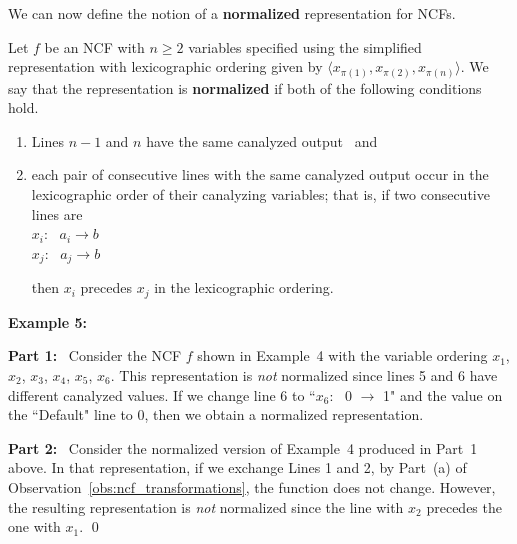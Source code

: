 
\medskip
We can now define the notion of a \textbf{normalized} 
representation for NCFs.

\begin{definition}
\label{def:normalized}
Let $f$ be an NCF with $n \geq 2$ variables specified using
the simplified representation with 
lexicographic ordering given by  
$\langle x_{\pi(1)}, x_{\pi(2)}, x_{\pi(n)}\rangle$.
We say that the representation is {\bf normalized} if
both of the following conditions hold.
\begin{enumerate}
  \item Lines $n-1$ and $n$ have the same canalyzed output ~and
  \item each pair of consecutive lines
        with the same canalyzed output occur in the lexicographic order 
        of their canalyzing variables; that is, if two consecutive lines are \\
\noindent
\hspace*{1.1in} $x_i$:~ $a_i \longrightarrow b$ \\
\hspace*{1.1in} $x_j$:~ $a_j \longrightarrow b$

\noindent
then $x_i$ precedes $x_j$ in the lexicographic ordering.
\end{enumerate}
\end{definition}

\noindent
\textbf{Example 5:}~ 

\medskip
\noindent
\textbf{Part 1:}~
Consider the NCF $f$ shown in Example~4 with
the variable ordering $x_1$, $x_2$, $x_3$, $x_4$, $x_5$, $x_6$.
This representation is \emph{not} normalized since lines 5 and 6
have different canalyzed values.
If we change line 6 to ``$x_6$:~ 0 $\longrightarrow$ 1" and the
value on the ``Default" line to 0, then we obtain 
a normalized representation. 

\medskip
\noindent
\textbf{Part 2:}~ Consider the normalized version of Example~4 
produced in Part~1 above. 
In that representation, if we exchange Lines 1 and 2, 
by Part~(a) of Observation~\ref{obs:ncf_transformations},
the function does not change. 
However, the resulting representation is \emph{not} normalized
since the line with $x_2$ precedes the one 
with $x_1$. \qed

